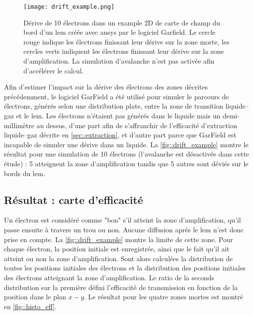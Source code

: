         \begin{figure}[htpb]
          \centering
          \texttt{[image: drift\_example.png]}
          \caption[Dérive de 10 électrons dans la carte de champ du bord d'un LEM avec Garfield]{Dérive de 10 électrons dans un example 2D de carte de champ du bord d'un \gls{lem} créée avec \gls{ansys} par le logiciel Garfield. Le cercle rouge indique les électrons finissant leur dérive sur la zone morte, les cercles verts indiquent les électrons finissant leur dérive sur la zone d'amplification. La simulation d'avalanche n'est pas activée afin d'accélérer le calcul.}
          \label{fig::drift_example}
        \end{figure}
                
        Afin d'estimer l'impact sur la dérive des électrons des zones décrites précédemment, le logiciel GarField \cite{garfield} a été utilisé pour simuler le parcours de  électrons, générés selon une distribution plate, entre la zone de transition liquide--gaz et le \gls{lem}. Les électrons n'étaient pas générés dans le liquide mais un demi-millimètre au dessus, d'une part afin de s'affranchir de l'efficacité d'extraction liquide--gaz décrite en \autoref{sec::extraction}, et d'autre part parce que GarField est incapable de simuler une dérive dans un liquide. La \autoref{fig::drift_example} montre le résultat pour une simulation de 10 électrons (l'avalanche est désactivée dans cette étude) : 5 atteignent la zone d'amplification tandis que 5 autres sont déviés sur le bords du \gls{lem}.
                
    \subsection{Résultat : carte d'efficacité}
        
      Un électron est considéré comme "bon" s'il atteint la zone d'amplification, qu'il passe ensuite à travers un trou ou non. Aucune diffusion après le \gls{lem} n'est donc prise en compte. La \autoref{fig::drift_example} montre la limite de cette zone. Pour chaque électron, la position initiale est enregistrée, ainsi que le fait qu'il ait atteint ou non la zone d'amplification. Sont alors calculées la distribution de toutes les positions initiales des électrons et la distribution des positions initiales des électrons atteignant la zone d'amplification. Le ratio de la seconds distribution sur la première défini l'efficacité de transmission en fonction de la position dans le plan $x-y$. Le résultat pour les quatre zones mortes est montré en \autoref{fig::histo_eff}.
            
